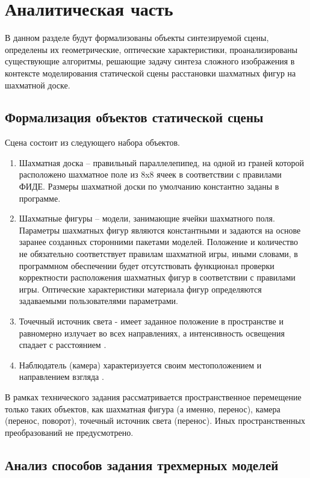 \chapter{Аналитическая часть}

В данном разделе будут формализованы объекты синтезируемой сцены, определены их геометрические, оптические характеристики, проанализированы существующие алгоритмы, решающие задачу синтеза сложного изображения в контексте моделирования статической сцены расстановки шахматных фигур на шахматной доске.

\section{Формализация объектов статической сцены}

Сцена состоит из следующего набора объектов.

\begin{enumerate}
	\item Шахматная доска – правильный параллелепипед, на одной из граней которой расположено шахматное поле из 8x8 ячеек в соответствии с правилами ФИДЕ. Размеры шахматной доски по умолчанию константно заданы в программе.
	\item Шахматные фигуры – модели, занимающие ячейки шахматного поля. Параметры шахматных фигур являются константными и задаются на основе заранее созданных сторонними пакетами моделей. Положение и количество не обязательно соответствует правилам шахматной игры, иными словами, в программном обеспечении будет отсутствовать функционал проверки корректности расположения шахматных фигур в соответствии с правилами игры. Оптические характеристики материала фигур определяются задаваемыми пользователями параметрами.
	\item Точечный источник света - имеет заданное положение в пространстве и равномерно излучает во всех направлениях, а интенсивность освещения спадает с расстоянием \cite{kurov:2023}. 
	\item Наблюдатель (камера) характеризуется своим местоположением и направлением взгляда \cite{kurov:2023}.
\end{enumerate}

В рамках технического задания рассматривается пространственное перемещение только таких объектов, как шахматная фигура (а именно, перенос), камера (перенос, поворот), точечный источник света (перенос). Иных пространственных преобразований не предусмотрено.

\section{Анализ способов задания трехмерных моделей}

